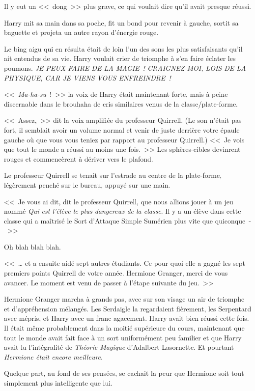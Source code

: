 Il y eut un <<~dong~>> plus grave, ce qui voulait dire qu'il avait presque réussi.

Harry mit sa main dans sa poche, fit un bond pour revenir à gauche, sortit sa baguette et projeta un autre rayon d'énergie rouge.

Le bing aigu qui en résulta était de loin l'un des sons les plus satisfaisants qu'il ait entendus de sa vie. Harry voulait crier de triomphe à s'en faire éclater les poumons. \emph{JE PEUX FAIRE DE LA MAGIE~! CRAIGNEZ-MOI, LOIS DE LA PHYSIQUE, CAR JE VIENS VOUS ENFREINDRE~!}

<<~\emph{Ma-ha-su}~!~>> la voix de Harry était maintenant forte, mais à peine discernable dans le brouhaha de cris similaires venus de la classe/plate-forme.

<<~Assez,~>> dit la voix amplifiée du professeur Quirrell. (Le son n'était pas fort, il semblait avoir un volume normal et venir de juste derrière votre épaule gauche où que vous vous teniez par rapport au professeur Quirrell.) <<~Je vois que tout le monde a réussi au moins une fois.~>> Les sphères-cibles devinrent rouges et commencèrent à dériver vers le plafond.

Le professeur Quirrell se tenait sur l'estrade au centre de la plate-forme, légèrement penché sur le bureau, appuyé sur une main.

<<~Je vous ai dit, dit le professeur Quirrell, que nous allions jouer à un jeu nommé \emph{Qui est l'élève le plus dangereux de la classe}. Il y a un élève dans cette classe qui a maîtrisé le Sort d'Attaque Simple Sumérien plus vite que quiconque~-~>>

Oh blah blah blah.

<<~… et a ensuite aidé sept autres étudiants. Ce pour quoi elle a gagné les sept premiers points Quirrell de votre année. Hermione Granger, merci de vous avancer. Le moment est venu de passer à l'étape suivante du jeu.~>>

Hermione Granger marcha à grands pas, avec sur son visage un air de triomphe et d'appréhension mélangés. Les Serdaigle la regardaient fièrement, les Serpentard avec mépris, et Harry avec un franc agacement. Harry avait bien réussi cette fois. Il était même probablement dans la moitié supérieure du cours, maintenant que tout le monde avait fait face à un sort uniformément peu familier et que Harry avait lu l'intégralité de \emph{Théorie Magique} d'Adalbert Lasornette. Et pourtant \emph{Hermione était encore meilleure}.

Quelque part, au fond de ses pensées, se cachait la peur que Hermione soit tout simplement plus intelligente que lui.

